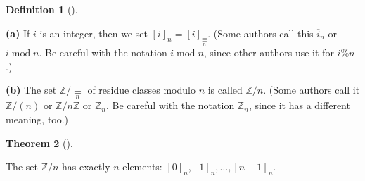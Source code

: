 \documentclass[numbers=enddot,12pt,final,onecolumn,notitlepage]{scrartcl}%
\numberwithin{exer}{subsection}
\theoremstyle{definition}
\newtheorem{theo}{Theorem}[subsection]
\newenvironment{theorem}[1][]
{\begin{theo}[#1]\begin{leftbar}}
{\end{leftbar}\end{theo}}
\newtheorem{defi}[theo]{Definition}
\newenvironment{definition}[1][]
{\begin{defi}[#1]\begin{leftbar}}
{\end{leftbar}\end{defi}}
\begin{document}
\begin{definition}
\textbf{(a)} If $i$ is an integer, then we set $\left[  i\right]  _{n}=\left[
i\right]  _{\underset{n}{\equiv}}$. (Some authors call this $\overline{i}_{n}$
or $i\operatorname{mod}n$. Be careful with the notation $i\operatorname{mod}%
n$, since other authors use it for $i\%n$.)

\textbf{(b)} The set $\mathbb{Z}/\underset{n}{\equiv}$ of residue classes
modulo $n$ is called $\mathbb{Z}/n$. (Some authors call it $\mathbb{Z}/\left(
n\right)  $ or $\mathbb{Z}/n\mathbb{Z}$ or $\mathbb{Z}_{n}$. Be careful with
the notation $\mathbb{Z}_{n}$, since it has a different meaning, too.)
\end{definition}

\begin{theorem}
\label{thm.equiv.Zn.explicit}The set $\mathbb{Z}/n$ has exactly $n$ elements:
$\left[  0\right]  _{n},\left[  1\right]  _{n},\ldots,\left[  n-1\right]
_{n}$.
\end{theorem}
\end{document}
